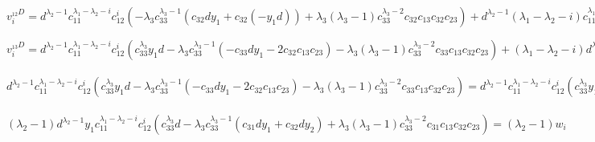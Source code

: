 %
%
$ v_i^{_{12}D} = d^{\lambda_2 - 1} c_{11}^{\lambda_1 - \lambda_2 - i} c_{12}^i (- \lambda_3 c_{33}^{\lambda_3 - 1} (c_{32} d y_1 + c_{32} (-y_1 d)) + \lambda_3 (\lambda_3 - 1) c_{33}^{\lambda_3 - 2} c_{32}c_{13}c_{32}c_{23}) + 
d^{\lambda_2 - 1} (\lambda_1 - \lambda_2 - i) c_{11}^{\lambda_1 - \lambda_2 - (i + 1)} c_{12}^{i + 1} (c_{33}^{\lambda_3} d - \lambda_3 c_{33}^{\lambda_3 - 1} (c_{31} d y_1 + c_{32} d y_2) + \lambda_3 (\lambda_3 - 1) c_{33}^{\lambda_3 - 2} c_{31}c_{13}c_{32}c_{23}) = (\lambda_1 - \lambda_2 - i)v_{i + 1} $
\newline

%
%
$ v_i^{_{13}D} = d^{\lambda_2 - 1} c_{11}^{\lambda_1 - \lambda_2 - i} c_{12}^i (c_{33}^{\lambda_3} y_1 d - \lambda_3 c_{33}^{\lambda_3 - 1} (- c_{33} d y_1 - 2 c_{32} c_{13} c_{23}) - \lambda_3 (\lambda_3 - 1) c_{33}^{\lambda_3 - 2} c_{33}c_{13}c_{32}c_{23}) + (\lambda_1 - \lambda_2 - i) d^{\lambda_2 - 1} c_{11}^{\lambda_1 - \lambda_2 - i - 1} c_{13} c_{12}^i (c_{33}^{\lambda_3} d - \lambda_3 c_{33}^{\lambda_3 - 1} (c_{31} d y_1 + c_{32} d y_2) + \lambda_3 (\lambda_3 - 1) c_{33}^{\lambda_3 - 2} c_{31}c_{13}c_{32}c_{23}) + (\lambda_2 - 1) d^{\lambda_2 - 1} y_1 c_{11}^{\lambda_1 - \lambda_2 - i} c_{12}^i (c_{33}^{\lambda_3} d - \lambda_3 c_{33}^{\lambda_3 - 1} (c_{31} d y_1 + c_{32} d y_2) + \lambda_3 (\lambda_3 - 1) c_{33}^{\lambda_3 - 2} c_{31}c_{13}c_{32}c_{23}) = (*) $
\\
\\
$ d^{\lambda_2 - 1} c_{11}^{\lambda_1 - \lambda_2 - i} c_{12}^i (c_{33}^{\lambda_3} y_1 d - \lambda_3 c_{33}^{\lambda_3 - 1} (- c_{33} d y_1 - 2 c_{32}c_{13}c_{23}) - \lambda_3 (\lambda_3 - 1) c_{33}^{\lambda_3 - 2} c_{33}c_{13}c_{32}c_{23}) = d^{\lambda_2 - 1} c_{11}^{\lambda_1 - \lambda_2 - i} c_{12}^i (c_{33}^{\lambda_3} y_1 d + \lambda_3 c_{33}^{\lambda_3} d y_1 + 2 \lambda_3 c_{33}^{\lambda_3 - 1} c_{32}c_{13}c_{23} + \lambda_3 (\lambda_3 - 1) c_{33}^{\lambda_3 - 1} c_{32}c_{13}c_{23})
= d^{\lambda_2 - 1} c_{11}^{\lambda_1 - \lambda_2 - i} c_{12}^i ( (\lambda_3 + 1) c_{33}^{\lambda_3} y_1 d - (\lambda_3 + 1) \lambda_3 c_{33}^{\lambda_3 - 1} c_{32}c_{23}c_{13}) = (\lambda_3 + 1) w_i $
\\
\\
$ (\lambda_2 - 1) d^{\lambda_2 - 1} y_1 c_{11}^{\lambda_1 - \lambda_2 - i} c_{12}^i (c_{33}^{\lambda_3} d - \lambda_3 c_{33}^{\lambda_3 - 1} (c_{31} d y_1 + c_{32} d y_2) + \lambda_3 (\lambda_3 - 1) c_{33}^{\lambda_3 - 2} c_{31}c_{13}c_{32}c_{23}) = (\lambda_2 - 1) w_i $
\\
